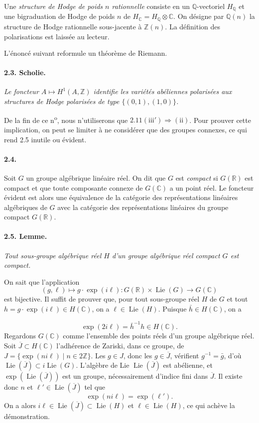 \documentclass[10pt,leqno]{article}
\newcommand{\C}{\mathbb{C}}
\newcommand{\Q}{\mathbb{Q}}
\newcommand{\R}{\mathbb{R}}
\newcommand{\Z}{\mathbb{Z}}
\newcommand{\Lie}{\operatorname{Lie}}
\begin{document}
Une \emph{structure de Hodge de poids $n$ rationnelle} consiste en un $\Q$-vectoriel $H_\Q$ et une bigraduation de Hodge de poids $n$ de $H_\C=H_\Q\otimes\C$. On désigne par $\Q(n)$ la structure de Hodge rationnelle sous-jacente à $\Z(n)$. La définition des polarisations est laissée au lecteur.

L'énoncé suivant reformule un théorème de Riemann.

\paragraph{2.3. Scholie.} \emph{Le foncteur $A\mapsto H^1(A,\Z)$ identifie les variétés abéliennes polarisées aux structures de Hodge polarisées de type $\{(0,1),(1,0)\}$.}

De la fin de ce n\textsuperscript{o}, nous n'utiliserons que $2.11(\mathrm{iii}')\Rightarrow(\mathrm{ii})$. Pour prouver cette implication, on peut se limiter à ne considérer que des groupes connexes, ce qui rend 2.5 inutile ou évident.

\paragraph{2.4.} Soit $G$ un groupe algébrique linéaire réel. On dit que $G$ est \emph{compact} si $G(\R)$ est compact et que toute composante connexe de $G(\C)$ a un point réel. Le foncteur évident est alors une équivalence de la catégorie des représentations linéaires algébriques de $G$ avec la catégorie des représentations linéaires du groupe compact $G(\R)$.

\paragraph{2.5. Lemme.} \emph{Tout sous-groupe algébrique réel $H$ d'un groupe algébrique réel compact $G$ est compact.}

On sait que l'application
\[
(g,\ell)\longmapsto g\cdot\exp(i\ell):G(\R)\times\Lie(G)\longrightarrow G(\C)
\]
est bijective. Il suffit de prouver que, pour tout sous-groupe réel $H$ de $G$ et tout $h=g\cdot\exp(i\ell)\in H(\C)$, on a $\ell\in\Lie(H)$. Puisque $\bar h\in H(\C)$, on a

\clearpage

\[
\exp(2i\ell)=\bar h^{-1}h\in H(\C).
\]
Regardons $G(\C)$ comme l'ensemble des points réels d'un groupe algébrique réel. Soit $\overline J\subset H(\C)$ l'adhérence de Zariski, dans ce groupe, de $J=\{\exp(ni\ell)\mid n\in2\Z\}$. Les $g\in J$, donc les $g\in\overline J$, vérifient $g^{-1}=\bar g$, d'où $\Lie(\overline J)\subset i\Lie(G)$. L'algèbre de Lie $\Lie(\overline J)$ est abélienne, et $\exp(\Lie(\overline J))$ est un groupe, nécessairement d'indice fini dans $\overline J$. Il existe donc $n$ et $\ell'\in\Lie(\overline J)$ tel que
\[
\exp(ni\ell)=\exp(\ell').
\]
On a alors $i\ell\in\Lie(\overline J)\subset\Lie(H)$ et $\ell\in\Lie(H)$, ce qui achève la démonstration.
\end{document}
